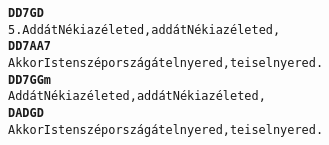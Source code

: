 \begin{minipage}{\textwidth}
\begin{alltt}
\textbf{           D          D7          G          D}
5. Add át Néki az életed, add át Néki az életed,
\textbf{         D              D7         A               A7}
   Akkor Isten szép országát elnyered, te is elnyered.
\textbf{           D          D7          G          Gm}
   Add át Néki az életed, add át Néki az életed,
\textbf{         D              A          D         G     D}
   Akkor Isten szép országát elnyered, te is elnyered.
\end{alltt}
\vspace{0.0cm}
\versszakspacing
\end{minipage}
~\vspace{1.0cm}
\newline
